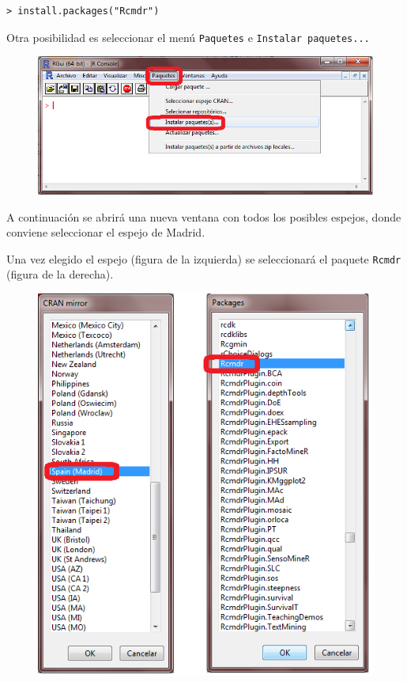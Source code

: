 \documentclass[]{book}
\begin{document}
\begin{verbatim}
> install.packages("Rcmdr")
\end{verbatim}

Otra posibilidad es seleccionar el menú \texttt{Paquetes} e
\texttt{Instalar\ paquetes...}

\begin{figure}
\centering
\includegraphics{figuras/Rcommander1.png}
\caption{}
\end{figure}

A continuación se abrirá una nueva ventana con todos los posibles
espejos, donde conviene seleccionar el espejo de Madrid.

Una vez elegido el espejo (figura de la izquierda) se seleccionará el
paquete \texttt{Rcmdr} (figura de la derecha).

\begin{figure}
\centering
\includegraphics{figuras/Rcommander2.png}
\caption{}
\end{figure}
\end{document}
